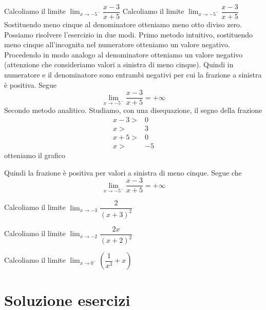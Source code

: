 \begin{exercise}
Calcoliamo il limite 
	$\lim_{x\to -5^-}\dfrac{x-3}{x+5}$
	\tcblower
	Calcoliamo il limite 
	$\lim_{x\to -5^-}\dfrac{x-3}{x+5}$
	Sostituendo meno cinque al denominatore otteniamo meno otto diviso zero. Possiamo risolvere l'esercizio in due modi. Primo metodo intuitivo, sostituendo meno cinque all'incognita nel numeratore otteniamo un valore negativo. Procedendo in modo analogo al denominatore otteniamo un valore negativo (attenzione che consideriamo valori a sinistra di meno cinque). Quindi in numeratore e il denominatore sono entrambi negativi per cui la frazione a sinistra è positiva. Segue \begin{equation*}
	\lim_{x\to -5^-}\dfrac{x-3}{x+5}=+\infty
	\end{equation*} Secondo metodo analitico. Studiamo, con una disequazione, il segno della frazione
	\begin{align*}
	x-3>&0\\
	x>&3\\
	x+5>&0\\
	x>&-5
	\end{align*} 
	otteniamo il grafico
	\begin{center}
		
	\end{center}
	Quindi la frazione è positiva per valori a sinistra di meno cinque. Segue che 
	\begin{equation*}
		\lim_{x\to -5^-}\dfrac{x-3}{x+5}=+\infty
	\end{equation*}
\end{exercise}
	\begin{exercise}[no solution]
Calcoliamo il limite
	$\lim_{x\to -3}\dfrac{2}{(x+3)^2}$

\end{exercise}
	\begin{exercise}[no solution]
Calcoliamo il limite
	$\lim_{x\to -2}\dfrac{2x}{(x+2)^2}$
\end{exercise}
	\begin{exercise}[no solution]
	Calcoliamo il limite
	$\lim_{x\to 0^-}\left(\dfrac{1}{x^3}+x\right)$
\end{exercise}
\tcbstoprecording
\newpage
\section{Soluzione esercizi}
\tcbinputrecords
\newpage
